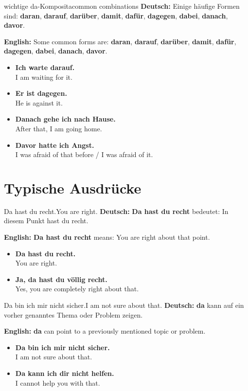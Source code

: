 \documentclass[a4paper,11pt]{article}
\newcommand{\GermanText}[1]{\textbf{Deutsch: }#1\par}
\newcommand{\EnglishText}[1]{{\small\color{SoftGray}\textbf{English: }#1\par}}
\newcommand{\ExampleItem}[2]{\item \textbf{#1}\\{\small\color{SoftGray}#2}}
\begin{document}
\begin{grammarentry}{wichtige da-Komposita}{common combinations}
\GermanText{Einige häufige Formen sind: \textbf{daran}, \textbf{darauf}, \textbf{darüber}, \textbf{damit}, \textbf{dafür}, \textbf{dagegen}, \textbf{dabei}, \textbf{danach}, \textbf{davor}.}
\EnglishText{Some common forms are: \textbf{daran}, \textbf{darauf}, \textbf{darüber}, \textbf{damit}, \textbf{dafür}, \textbf{dagegen}, \textbf{dabei}, \textbf{danach}, \textbf{davor}.}

\begin{exbox}
\begin{itemize}
    \ExampleItem{Ich warte darauf.}{I am waiting for it.}
    \ExampleItem{Er ist dagegen.}{He is against it.}
    \ExampleItem{Danach gehe ich nach Hause.}{After that, I am going home.}
    \ExampleItem{Davor hatte ich Angst.}{I was afraid of that before / I was afraid of it.}
\end{itemize}
\end{exbox}
\end{grammarentry}

\section{Typische Ausdrücke}

\begin{grammarentry}{Da hast du recht.}{You are right.}
\GermanText{\textbf{Da hast du recht} bedeutet: In diesem Punkt hast du recht.}
\EnglishText{\textbf{Da hast du recht} means: You are right about that point.}

\begin{exbox}
\begin{itemize}
    \ExampleItem{Da hast du recht.}{You are right.}
    \ExampleItem{Ja, da hast du völlig recht.}{Yes, you are completely right about that.}
\end{itemize}
\end{exbox}
\end{grammarentry}

\begin{grammarentry}{Da bin ich mir nicht sicher.}{I am not sure about that.}
\GermanText{\textbf{da} kann auf ein vorher genanntes Thema oder Problem zeigen.}
\EnglishText{\textbf{da} can point to a previously mentioned topic or problem.}

\begin{exbox}
\begin{itemize}
    \ExampleItem{Da bin ich mir nicht sicher.}{I am not sure about that.}
    \ExampleItem{Da kann ich dir nicht helfen.}{I cannot help you with that.}
\end{itemize}
\end{exbox}
\end{grammarentry}
\end{document}
